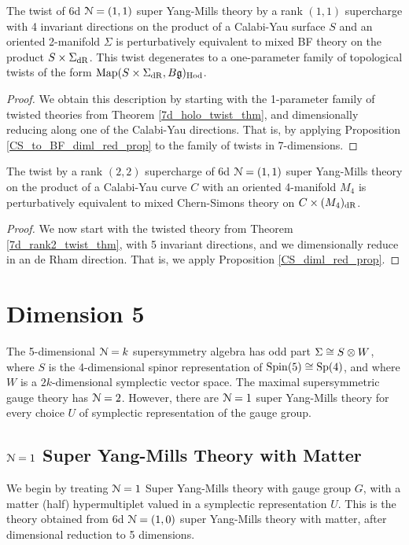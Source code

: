 \documentclass[10pt, oneside]{article}
\begin{document}
\begin{theorem} \label{6d_rk11_twist_thm}
The twist of 6d $\mathcal{N}=(1,1)$ super Yang-Mills theory by a rank $(1,1)$ supercharge with 4 invariant directions on the product of a Calabi-Yau surface $S$ and an oriented 2-manifold $\Sigma$ is perturbatively equivalent to mixed BF theory on the product $S \times \Sigma_{\mathrm{dR}}$. This twist degenerates to a one-parameter family of topological twists of the form $\operatorname{Map}(S \times \Sigma_{\mathrm{dR}}, B\mathfrak{g})_{\mathrm{Hod}}$.
\end{theorem}

\begin{proof}
We obtain this description by starting with the 1-parameter family of twisted theories from Theorem \ref{7d_holo_twist_thm}, and dimensionally reducing along one of the Calabi-Yau directions.  That is, by applying Proposition \ref{CS_to_BF_diml_red_prop} to the family of twists in 7-dimensions.
\end{proof}

\begin{theorem} \label{6d_rk22_twist_thm}
The twist by a rank $(2,2)$ supercharge of 6d $\mathcal{N}=(1,1)$ super Yang-Mills theory on the product of a Calabi-Yau curve $C$ with an oriented 4-manifold $M_4$ is perturbatively equivalent to mixed Chern-Simons theory on $C \times (M_4)_{\mathrm{dR}}$.
\end{theorem}

\begin{proof}
We now start with the twisted theory from Theorem \ref{7d_rank2_twist_thm}, with 5 invariant directions, and we dimensionally reduce in an de Rham direction.  That is, we apply Proposition \ref{CS_diml_red_prop}.
\end{proof}

\section{Dimension 5}
The 5-dimensional $\mathcal{N}=k$ supersymmetry algebra has odd part $\Sigma \cong S \otimes W$, where $S$ is the 4-dimensional spinor representation of $\mathrm{Spin}(5) \cong \mathrm{Sp}(4)$, and where $W$ is a $2k$-dimensional symplectic vector space.  The maximal supersymmetric gauge theory has $\mathcal{N}=2$.  However, there are $\mathcal{N}=1$ super Yang-Mills theory for every choice $U$ of symplectic representation of the gauge group.

\subsection{$\mathcal{N} = 1$ Super Yang-Mills Theory with Matter}  \label{5d_1_section}
We begin by treating $\mathcal{N}=1$ Super Yang-Mills theory with gauge group $G$, with a matter (half) hypermultiplet valued in a symplectic representation $U$.  This is the theory obtained from 6d $\mathcal{N}=(1,0)$ super Yang-Mills theory with matter, after dimensional reduction to 5 dimensions.
\end{document}
